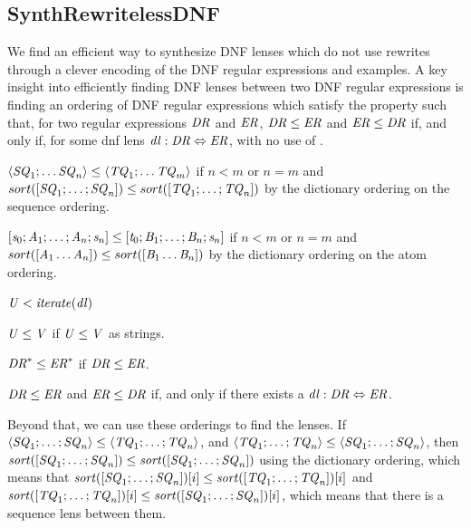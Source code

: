 \subsection{SynthRewritelessDNF}
We find an efficient way to synthesize DNF lenses which do not use rewrites
through a clever encoding of the DNF regular expressions and examples.
A key insight into efficiently finding DNF lenses between two DNF regular
expressions is finding an ordering of DNF regular expressions which satisfy the
property such that, for two regular expressions $\mathit{DR}$ and $\mathit{ER}$,
$\mathit{DR} \leq \mathit{ER}$ and $\mathit{ER} \leq \mathit{DR}$ if, and only if,
for some dnf lens $\mathit{dl} : \mathit{DR} \Leftrightarrow \mathit{ER}$,
with no use of \DNFRewriteLensRule{}.

\begin{definition}
$\langle\mathit{SQ}_1;\ldots\mathit{SQ}_n\rangle \leq
\langle\mathit{TQ}_1;\ldots\mathit{TQ}_m\rangle$
if $n<m$ or $n=m$ and
$sort([\mathit{SQ}_1;\ldots;\mathit{SQ}_n])\leq
sort([\mathit{TQ}_1;\ldots;\mathit{TQ}_n])$ by the dictionary ordering
on the sequence ordering.

$[\mathit{s}_0;\mathit{A}_1;\ldots;\mathit{A}_n;\mathit{s}_n] \leq
[\mathit{t}_0;\mathit{B}_1;\ldots;\mathit{B}_n;\mathit{s}_n]$
if $n<m$ or $n=m$ and
$sort([\mathit{A}_1\ldots\mathit{A}_n])\leq
sort([\mathit{B}_1\ldots\mathit{B}_n])$ by the dictionary ordering on the
atom ordering.

$\mathit{U} < \mathit{iterate(\mathit{dl})}$

$\mathit{U} \leq \mathit{V}$ if
$\mathit{U} \leq \mathit{V}$ as strings.

$\mathit{DR}^* \leq \mathit{ER}^*$ if $\mathit{DR} \leq \mathit{ER}$.
\end{definition}

\begin{theorem}
$\mathit{DR}\leq\mathit{ER}$ and $\mathit{ER}\leq\mathit{DR}$ if, and only
if there exists a $\mathit{dl} : \mathit{DR} \Leftrightarrow \mathit{ER}$.
\end{theorem}

Beyond that, we can use these orderings to find the lenses.
If $\langle\mathit{SQ}_1;\ldots;\mathit{SQ}_n\rangle\leq\langle\mathit{TQ}_1;\ldots;\mathit{TQ}_n\rangle$,
and $\langle\mathit{TQ}_1;\ldots;\mathit{TQ}_n\rangle\leq\langle\mathit{SQ}_1;\ldots;\mathit{SQ}_n\rangle$,
then $\mathit{sort}([\mathit{SQ}_1;\ldots;\mathit{SQ}_n])\leq\mathit{sort}([\mathit{SQ}_1;\ldots;\mathit{SQ}_n])$
using the dictionary ordering, which means that
$\mathit{sort}([\mathit{SQ}_1;\ldots;\mathit{SQ}_n])[i]\leq
\mathit{sort}([\mathit{TQ}_1;\ldots;\mathit{TQ}_n])[i]$ and
$\mathit{sort}([\mathit{TQ}_1;\ldots;\mathit{TQ}_n])[i]\leq
\mathit{sort}([\mathit{SQ}_1;\ldots;\mathit{SQ}_n])[i]$, which means that there is a
sequence lens between them.

